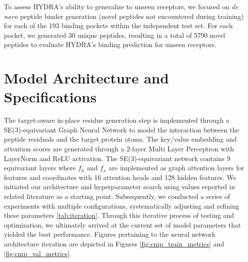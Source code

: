 To assess HYDRA's ability to generalize to unseen receptors, we focused on \textit{de novo} peptide binder generation (novel peptides not encountered during training) for each of the 193 binding pockets within the independent test set. For each pocket, we generated 30 unique peptides, resulting in a total of 5790 novel peptides to evaluate HYDRA's binding prediction for unseen receptors.

\section{Model Architecture and Specifications}
The target-aware in-place residue generation step is implemented through a SE(3)-equivariant Graph Neural Network to model the interaction between the peptide residuals and the target protein atoms. The key/value embedding and attention scores are generated through a 2-layer Multi Layer Perceptron with LayerNorm and ReLU activation.
The SE(3)-equivariant network contains 9 equivariant layers where $f_h$ and $f_x$ are implemented as graph attention layers for features and coordinates with 16 attention heads and 128 hidden features. We initiated our architecture and hyperparameter search using values reported in related literature \cite{guan20233d} as a starting point. Subsequently, we conducted a series of experiments with multiple configurations, systematically adjusting and refining these parameters \ref{tab:iteration}. Through this iterative process of testing and optimization, we ultimately arrived at the current set of model parameters that yielded the best performance. Figures pertaining to the neural network architecture iteration are depicted in Figures \ref{fig:cmp_train_metrics} and \ref{fig:cmp_val_metrics}. \\


